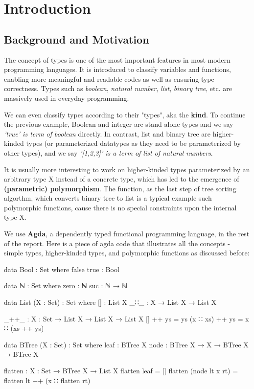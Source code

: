 \chapter{Introduction}

\section{Background and Motivation}

The concept of types is one of the most important features in most modern programming languages. It is introduced to classify variables and functions, enabling more meaningful and readable codes as well as ensuring type correctness. Types such as \textit{boolean}, \textit{natural number}, \textit{list}, \textit{binary tree}, etc. are massively used in everyday programming.

We can even classify types according to their "types", aka the \textbf{kind}. To continue the previous example, Boolean and integer are stand-alone types and we say \textit{'true' is term of boolean} directly. In contrast, list and binary tree are higher-kinded types (or parameterized datatypes as they need to be parameterized by other types), and we say \textit{'[1,2,3]' is a term of list of natural numbers}.

It is usually more interesting to work on higher-kinded types parameterized by an arbitrary type X instead of a concrete type, which has led to the emergence of \textbf{(parametric) polymorphism}. The  function, as the last step of tree sorting algorthm, which converts binary tree to list is a typical example such polymorphic functions, cause there is no special constraints upon the internal type X.

We use \textbf{Agda}, a dependently typed functional programming language, in the rest of the report. Here is a piece of agda code that illustrates all the concepts - simple types, higher-kinded types, and polymorphic functions as discussed before:

\begin{code}
data Bool : Set where
  false true : Bool

data ℕ : Set where
  zero : ℕ
  suc  : ℕ → ℕ

data List (X : Set) : Set where
  []  : List X
  _∷_ : X → List X → List X

_++_ : {X : Set} → List X → List X → List X
[] ++ ys = ys
(x ∷ xs) ++ ys = x ∷ (xs ++ ys)

data BTree (X : Set) : Set where
  leaf : BTree X
  node : BTree X → X → BTree X → BTree X

flatten : {X : Set} → BTree X → List X
flatten leaf = []
flatten (node lt x rt) = flatten lt ++ (x ∷ flatten rt)
\end{code}

